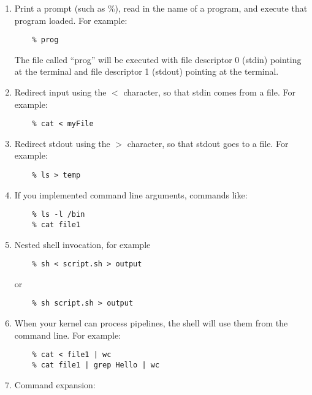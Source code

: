 \documentclass[11pt]{article}
\begin{document}
\begin{enumerate}
 \item Print a prompt (such as \%), read in the name of a program, and
   execute that program loaded.  For example:

\begin{verbatim}
    % prog
\end{verbatim}

The file called ``prog'' will be executed with file descriptor 0 (stdin)
pointing at the terminal and file descriptor 1 (stdout) pointing at
the terminal.

\item Redirect input using the $<$ character, so that stdin comes from a
  file.  For example:

\begin{verbatim}
    % cat < myFile
\end{verbatim}

\item Redirect stdout using the $>$ character, so that stdout goes to a file.  For example:

\begin{verbatim}
    % ls > temp
\end{verbatim}

\item If you implemented command line arguments, commands like:

\begin{verbatim}
    % ls -l /bin
    % cat file1
\end{verbatim}
  
\item Nested shell invocation, for example

\begin{verbatim}
    % sh < script.sh > output
\end{verbatim}
  or
\begin{verbatim}
    % sh script.sh > output
\end{verbatim}
  

\item When your kernel can process pipelines, the shell will use
  them from the command line.  For example:

\begin{verbatim}
    % cat < file1 | wc
    % cat file1 | grep Hello | wc
\end{verbatim}

\item Command expansion:


\end{enumerate}
\end{document}
